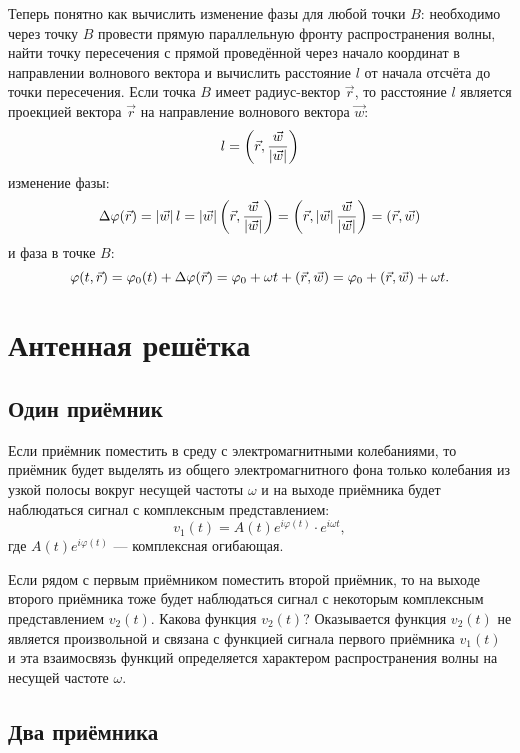 Теперь понятно как вычислить изменение фазы для любой точки $B$: необходимо через точку $B$ провести прямую параллельную фронту распространения волны, найти точку
пересечения с прямой проведённой через начало координат в направлении волнового вектора и вычислить расстояние $l$ от начала отсчёта до точки пересечения. Если
точка $B$ имеет радиус-вектор $\vec{r}$, то расстояние $l$ является проекцией вектора $\vec{r}$ на направление волнового вектора $\vec{w}$:
\[
    l = \left ( \vec{r}, \frac{\vec{w}}{\left | \vec{w} \right |} \right )
\]
изменение фазы:
\[
    \Delta \varphi ( \vec{r} )
    = \left | \vec{w} \right | l
    = \left | \vec{w} \right | \left ( \vec{r}, \frac{\vec{w}}{\left | \vec{w} \right |} \right )
    = \left ( \vec{r}, \left | \vec{w} \right |  \frac{\vec{w}}{\left | \vec{w} \right |} \right )
    = \left ( \vec{r}, \vec{w} \right )
\]
и фаза в точке $B$:
\[
    \varphi(t, \vec{r})
    = \varphi_0(t) + \Delta \varphi ( \vec{r} )
    = \varphi_0 + \omega t + \left ( \vec{r}, \vec{w} \right )
    = \varphi_0 + \left ( \vec{r}, \vec{w} \right ) + \omega t .
\]


\section{Антенная решётка}

\subsection{Один приёмник}

Если приёмник поместить в среду с электромагнитными колебаниями, то приёмник будет выделять из общего электромагнитного фона только колебания из узкой полосы вокруг
несущей частоты $\omega$ и на выходе приёмника будет наблюдаться сигнал с комплексным представлением:
\[
    v_1(t) = A(t) e^{i \varphi(t)} \cdot e^{i \omega t} ,
\]
где $A(t) e^{i \varphi(t)}$ --- комплексная огибающая.

Если рядом с первым приёмником поместить второй приёмник, то на выходе второго приёмника тоже будет наблюдаться сигнал с некоторым комплексным представлением $v_2(t)$.
Какова функция $v_2(t)$? Оказывается функция $v_2(t)$ не является произвольной и связана с функцией сигнала первого приёмника $v_1(t)$ и эта взаимосвязь
функций определяется характером распространения волны на несущей частоте $\omega$.

\subsection{Два приёмника}

